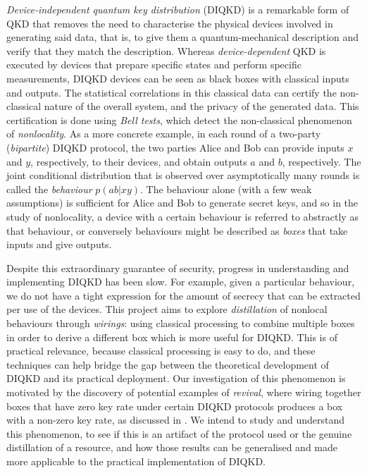\documentclass[10pt, a4paper]{article}
\numberwithin{equation}{section} %
\theoremstyle{definition}
\theoremstyle{plain}
\newcommand{\?}{\mathrel{?}} %
\begin{document}
    \emph{Device-independent quantum key distribution} (DIQKD) is a remarkable form of QKD that removes the need to characterise the physical devices involved in generating said data, that is, to give them a quantum-mechanical description and verify that they match the description. Whereas \emph{device-dependent} QKD is executed by devices that prepare specific states and perform specific measurements, DIQKD devices can be seen as black boxes with classical inputs and outputs. The statistical correlations in this classical data can certify the non-classical nature of the overall system, and the privacy of the generated data. This certification is done using \emph{Bell tests}, which detect the non-classical phenomenon of \emph{nonlocality}. As a more concrete example, in each round of a two-party (\emph{bipartite}) DIQKD protocol, the two parties Alice and Bob can provide inputs \(x\) and \(y\), respectively, to their devices, and obtain outputs \(a\) and \(b\), respectively. The joint conditional distribution that is observed over asymptotically many rounds is called the \emph{behaviour} \(p(ab|xy)\). The behaviour alone (with a few weak assumptions) is sufficient for Alice and Bob to generate secret keys, and so in the study of nonlocality, a device with a certain behaviour is referred to abstractly as that behaviour, or conversely behaviours might be described as \emph{boxes} that take inputs and give outputs.

    Despite this extraordinary guarantee of security, progress in understanding and implementing DIQKD has been slow. For example, given a particular behaviour, we do not have a tight expression for the amount of secrecy that can be extracted per use of the devices. This project aims to explore \emph{distillation} of nonlocal behaviours through \emph{wirings}: using classical processing to combine multiple boxes in order to derive a different box which is more useful for DIQKD\@. This is of practical relevance, because classical processing is easy to do, and these techniques can help bridge the gap between the theoretical development of DIQKD and its practical deployment. Our investigation of this phenomenon is motivated by the discovery of potential examples of \emph{revival}, where wiring together boxes that have zero key rate under certain DIQKD protocols produces a box with a non-zero key rate, as discussed in . We intend to study and understand this phenomenon, to see if this is an artifact of the protocol used or the genuine distillation of a resource, and how those results can be generalised and made more applicable to the practical implementation of DIQKD\@.
\end{document}
